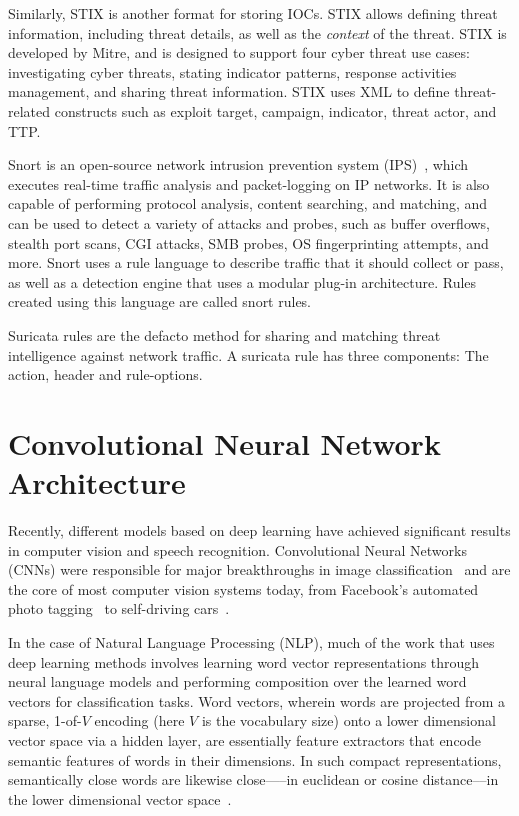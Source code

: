 Similarly, STIX is another format for storing IOCs. STIX allows defining threat information, including threat details, as well as the \emph{context} of the threat. STIX is developed by Mitre, and is designed to support four cyber threat use cases: investigating cyber threats, stating indicator patterns, response activities management, and sharing threat information. STIX uses XML to define threat-related constructs such as exploit target, campaign, indicator, threat actor, and TTP.

Snort is an open-source network intrusion prevention system (IPS)~\cite{sekar}, which  executes real-time traffic analysis and packet-logging on IP networks. It is also capable of performing protocol analysis, content searching, and matching, and can be used to detect a variety of attacks and probes, such as buffer overflows, stealth port scans, CGI attacks, SMB probes, OS fingerprinting attempts, and more. Snort uses a rule language to describe traffic that it should collect or pass, as well as a detection engine that uses a modular plug-in architecture. Rules created using this language are called snort rules.

Suricata rules are the defacto method for sharing and matching threat intelligence against network traffic. A suricata rule has three components: The action, header and rule-options.


\section{Convolutional Neural Network Architecture} \label{cnn}

Recently, different models based on deep learning have achieved significant results in computer vision and speech recognition. Convolutional Neural Networks (CNNs) were responsible for major breakthroughs in image classification~\cite{krizhevsky} and are the core of most computer vision systems today, from Facebook's automated photo tagging~\cite{stone} to self-driving cars~\cite{bojarski}. 

In the case of Natural Language Processing (NLP), much of the work that uses deep learning methods involves learning word vector representations through neural language models and performing composition over the learned word vectors for classification tasks. Word vectors, wherein words are projected from a sparse, 1-of-$V$ encoding (here $V$ is the vocabulary size) onto a lower dimensional vector space via a hidden layer, are essentially feature extractors that encode semantic features of words in their dimensions. In such compact representations, semantically close words are likewise close—--in euclidean or cosine distance–--in the lower dimensional vector space~\cite{mikolov}.

